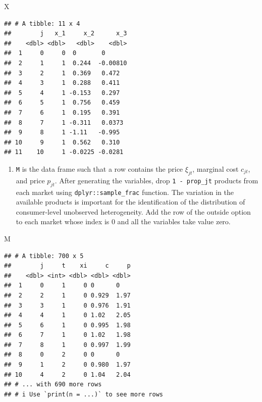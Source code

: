 \documentclass[
]{book}
\newenvironment{Shaded}{\begin{snugshade}}{\end{snugshade}}
\newcommand{\NormalTok}[1]{#1}
\providecommand{\tightlist}{%
  \setlength{\itemsep}{0pt}\setlength{\parskip}{0pt}}
\begin{document}
\begin{Shaded}
\begin{Highlighting}[]
\NormalTok{X}
\end{Highlighting}
\end{Shaded}

\begin{verbatim}
## # A tibble: 11 x 4
##        j   x_1     x_2      x_3
##    <dbl> <dbl>   <dbl>    <dbl>
##  1     0     0  0       0      
##  2     1     1  0.244  -0.00810
##  3     2     1  0.369   0.472  
##  4     3     1  0.288   0.411  
##  5     4     1 -0.153   0.297  
##  6     5     1  0.756   0.459  
##  7     6     1  0.195   0.391  
##  8     7     1 -0.311   0.0373 
##  9     8     1 -1.11   -0.995  
## 10     9     1  0.562   0.310  
## 11    10     1 -0.0225 -0.0281
\end{verbatim}

\begin{enumerate}
\def\labelenumi{\arabic{enumi}.}
\setcounter{enumi}{2}
\tightlist
\item
  \texttt{M} is the data frame such that a row contains the price \(\xi_{jt}\), marginal cost \(c_{jt}\), and price \(p_{jt}\). After generating the variables, drop \texttt{1\ -\ prop\_jt} products from each market using \texttt{dplyr::sample\_frac} function. The variation in the available products is important for the identification of the distribution of consumer-level unobserved heterogeneity. Add the row of the outside option to each market whose index is \(0\) and all the variables take value zero.
\end{enumerate}

\begin{Shaded}
\begin{Highlighting}[]
\NormalTok{M}
\end{Highlighting}
\end{Shaded}

\begin{verbatim}
## # A tibble: 700 x 5
##        j     t    xi     c     p
##    <dbl> <int> <dbl> <dbl> <dbl>
##  1     0     1     0 0      0   
##  2     2     1     0 0.929  1.97
##  3     3     1     0 0.976  1.91
##  4     4     1     0 1.02   2.05
##  5     6     1     0 0.995  1.98
##  6     7     1     0 1.02   1.98
##  7     8     1     0 0.997  1.99
##  8     0     2     0 0      0   
##  9     1     2     0 0.980  1.97
## 10     4     2     0 1.04   2.04
## # ... with 690 more rows
## # i Use `print(n = ...)` to see more rows
\end{verbatim}
\end{document}
